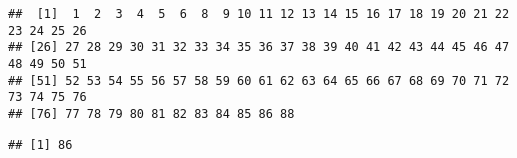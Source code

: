 \documentclass[
]{article}
\newenvironment{Shaded}{\begin{snugshade}}{\end{snugshade}}
\newcommand{\KeywordTok}[1]{\textcolor[rgb]{0.13,0.29,0.53}{\textbf{#1}}}
\newcommand{\NormalTok}[1]{#1}
\newcommand{\OperatorTok}[1]{\textcolor[rgb]{0.81,0.36,0.00}{\textbf{#1}}}
\newcommand{\StringTok}[1]{\textcolor[rgb]{0.31,0.60,0.02}{#1}}
\begin{document}
\begin{verbatim}
##  [1]  1  2  3  4  5  6  8  9 10 11 12 13 14 15 16 17 18 19 20 21 22 23 24 25 26
## [26] 27 28 29 30 31 32 33 34 35 36 37 38 39 40 41 42 43 44 45 46 47 48 49 50 51
## [51] 52 53 54 55 56 57 58 59 60 61 62 63 64 65 66 67 68 69 70 71 72 73 74 75 76
## [76] 77 78 79 80 81 82 83 84 85 86 88
\end{verbatim}

\begin{Shaded}
\end{Shaded}

\begin{verbatim}
## [1] 86
\end{verbatim}
\end{document}
